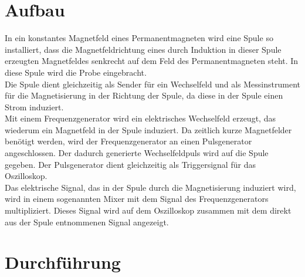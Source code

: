 \documentclass[12pt,a4paper]{article}
\begin{document}
\section{Aufbau}
In ein konstantes Magnetfeld eines Permanentmagneten wird eine Spule so installiert, dass die Magnetfeldrichtung eines durch Induktion in dieser Spule erzeugten Magnetfeldes senkrecht auf dem Feld des Permanentmagneten steht. In diese Spule wird die Probe eingebracht. \\
Die Spule dient gleichzeitig als Sender für ein Wechselfeld und als Messinstrument für die Magnetisierung in der Richtung der Spule, da diese in der Spule einen Strom induziert.\\
Mit einem Frequenzgenerator wird ein elektrisches Wechselfeld erzeugt, das wiederum ein Magnetfeld in der Spule induziert. Da zeitlich kurze Magnetfelder benötigt werden, wird der Frequenzgenerator an einen Pulsgenerator angeschlossen. Der dadurch generierte Wechselfeldpuls wird auf die Spule gegeben. Der Pulsgenerator dient gleichzeitig als Triggersignal für das Oszilloskop.\\
Das elektrische Signal, das in der Spule durch die Magnetisierung induziert wird, wird in einem sogenannten Mixer mit dem Signal des Frequenzgenerators multipliziert. Dieses Signal wird auf dem Oszilloskop zusammen mit dem direkt aus der Spule entnommenen Signal angezeigt.\\



\section{Durchführung}
\end{document}
